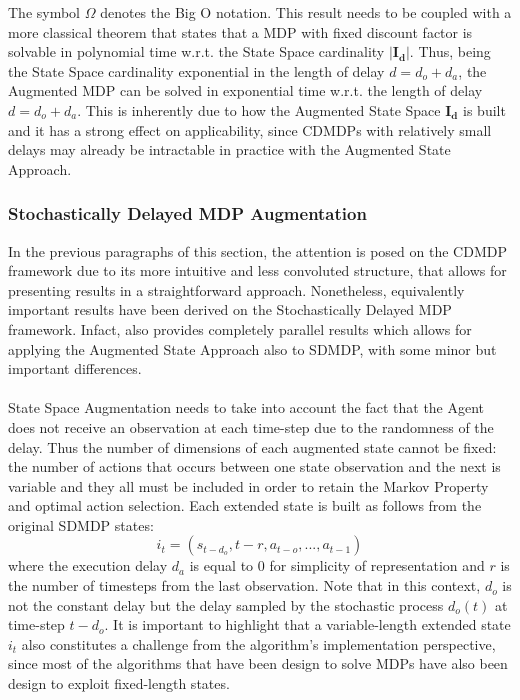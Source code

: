                 The symbol $\Omega$ denotes the Big O notation. This result needs to be coupled with a more classical theorem that states that a MDP with fixed discount factor is solvable in polynomial time w.r.t. the State Space cardinality $| \mathbf{I_d} |$. Thus, being the State Space cardinality exponential in the length of delay $d = d_o + d_a$, the Augmented MDP can be solved in exponential time w.r.t. the length of delay $d = d_o + d_a$. This is inherently due to how the Augmented State Space $\mathbf{I_d}$ is built and it has a strong effect on applicability, since CDMDPs with relatively small delays may already be intractable in practice with the Augmented State Approach.
                
            \subsubsection{Stochastically Delayed MDP Augmentation}
                \label{subsubs:sdmdpaug}
                In the previous paragraphs of this section, the attention is posed on the CDMDP framework due to its more intuitive and less convoluted structure, that allows for presenting results in a straightforward approach. Nonetheless, equivalently important results have been derived on the Stochastically Delayed MDP framework. Infact,  also provides completely parallel results which allows for applying the Augmented State Approach also to SDMDP, with some minor but important differences.
                \\\\
                State Space Augmentation needs to take into account the fact that the Agent does not receive an observation at each time-step due to the randomness of the delay. Thus the number of dimensions of each augmented state cannot be fixed: the number of actions that occurs between one state observation and the next is variable and they all must be included in order to retain the Markov Property and optimal action selection. Each extended state is built as follows from the original SDMDP states:
                \[ i_t = \left( s_{t-d_o}, t-r, a_{t-o}, ..., a_{t-1} \right) \]
                where the execution delay $d_a$ is equal to 0 for simplicity of representation and $r$ is the number of timesteps from the last observation. Note that in this context, $d_o$ is not the constant delay but the delay sampled by the stochastic process $d_o(t)$ at time-step $t-d_o$. It is important to highlight that a variable-length extended state $i_t$ also constitutes a challenge from the algorithm's implementation perspective, since most of the algorithms that have been design to solve MDPs have also been design to exploit fixed-length states.

